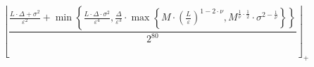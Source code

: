 \[\left\lfloor \frac{\frac{L \cdot \Delta + \sigma^{2}}{\varepsilon^{2}} + \min\left\{ \frac{L \cdot \Delta \cdot \sigma^{2}}{\varepsilon^{4}}, \frac{\Delta}{\varepsilon^{3}} \cdot \max\left\{ M \cdot \left(\frac{L}{\varepsilon}\right)^{1 - 2 \cdot \nu}, M^{\frac{1}{\nu} \cdot \frac{1}{2}} \cdot \sigma^{2 - \frac{1}{\nu}} \right\} \right\}}{2^{80}} \right\rfloor_{+}\]
